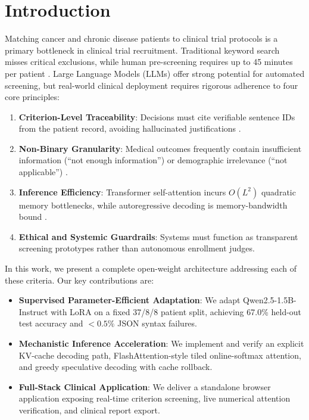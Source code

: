 \documentclass[conference]{IEEEtran}
\begin{document}
\section{Introduction}
Matching cancer and chronic disease patients to clinical trial protocols is a primary bottleneck in clinical trial recruitment. Traditional keyword search misses critical exclusions, while human pre-screening requires up to 45 minutes per patient \cite{jin2024matching}. Large Language Models (LLMs) offer strong potential for automated screening, but real-world clinical deployment requires rigorous adherence to four core principles:
\begin{enumerate}
    \item \textbf{Criterion-Level Traceability}: Decisions must cite verifiable sentence IDs from the patient record, avoiding hallucinated justifications \cite{wornow2024zero}.
    \item \textbf{Non-Binary Granularity}: Medical outcomes frequently contain insufficient information (``not enough information'') or demographic irrelevance (``not applicable'') \cite{jin2024matching, morrison2025systematic}.
    \item \textbf{Inference Efficiency}: Transformer self-attention incurs $O(L^2)$ quadratic memory bottlenecks, while autoregressive decoding is memory-bandwidth bound \cite{vaswani2017attention, dao2022flashattention, leviathan2023fast}.
    \item \textbf{Ethical and Systemic Guardrails}: Systems must function as transparent screening prototypes rather than autonomous enrollment judges.
\end{enumerate}

In this work, we present a complete open-weight architecture addressing each of these criteria. Our key contributions are:
\begin{itemize}
    \item \textbf{Supervised Parameter-Efficient Adaptation}: We adapt Qwen2.5-1.5B-Instruct with LoRA on a fixed 37/8/8 patient split, achieving 67.0\% held-out test accuracy and $<0.5\%$ JSON syntax failures.
    \item \textbf{Mechanistic Inference Acceleration}: We implement and verify an explicit KV-cache decoding path, FlashAttention-style tiled online-softmax attention, and greedy speculative decoding with cache rollback.
    \item \textbf{Full-Stack Clinical Application}: We deliver a standalone browser application exposing real-time criterion screening, live numerical attention verification, and clinical report export.
\end{itemize}
\end{document}
